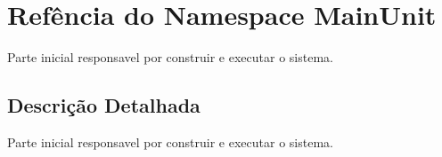 \hypertarget{namespaceMainUnit}{\section{Refência do Namespace Main\-Unit}
\label{namespaceMainUnit}
}


Parte inicial responsavel por construir e executar o sistema.  




\subsection{Descrição Detalhada}
Parte inicial responsavel por construir e executar o sistema. 